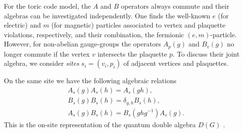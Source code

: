 \documentclass[two column]{article}
\newcommand{\jovan}[1]{\textcolor{blue}{[#1]}}
\begin{document}
For the toric code model, the $A$ and $B$ operators always commute and their algebras can be investigated independently. One finds the well-known $e$ (for electric) and $m$ (for magnetic) particles associated to vertex and plaquette violations, respectively, and their combination, the fermionic $(e,m)$-particle. However, for non-abelian gauge-groups the operators $A_p(g)$ and $B_v(g)$ no longer commute if the vertex $v$ intersects the plaquette $p$. To discuss their joint algebra, we consider \emph{sites}
 $s_i = (v_i, p_i)$ of adjacent vertices and plaquettes.
%
%

%
 
On the same site we have the following algebraic relations %
\begin{equation}
    \begin{split}
        A_s{(g)}A_s{(h)} = A_s{(gh)}, \\
        B_s{(g)}B_s{(h)} = \delta_{g,h} B_s{(h)},\\
        A_s{(g)}B_s{(h)} = B_s{(ghg^{-1})}A_s{(g)}.
    \end{split}\label{eqn:alg}
\end{equation}
This is the on-site representation of the quantum double algebra $D(G)$ 
\cite{cui2018topological, Kitaev_2003}. 
\end{document}
